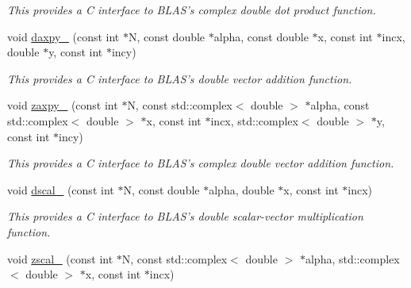 \begin{DoxyCompactItemize}
\begin{DoxyCompactList}\small\item\em This provides a C interface to B\-L\-A\-S's complex double dot product function. \end{DoxyCompactList}\item 
\hypertarget{namespacekeycpp_ae99c5b242a21ba683701ccb6ab6534b1}{void \hyperlink{namespacekeycpp_ae99c5b242a21ba683701ccb6ab6534b1}{daxpy\-\_\-} (const int $\ast$N, const double $\ast$alpha, const double $\ast$x, const int $\ast$incx, double $\ast$y, const int $\ast$incy)}\label{namespacekeycpp_ae99c5b242a21ba683701ccb6ab6534b1}

\begin{DoxyCompactList}\small\item\em This provides a C interface to B\-L\-A\-S's double vector addition function. \end{DoxyCompactList}\item 
\hypertarget{namespacekeycpp_a6460fa334239dde761d8f737b9438fed}{void \hyperlink{namespacekeycpp_a6460fa334239dde761d8f737b9438fed}{zaxpy\-\_\-} (const int $\ast$N, const std\-::complex$<$ double $>$ $\ast$alpha, const std\-::complex$<$ double $>$ $\ast$x, const int $\ast$incx, std\-::complex$<$ double $>$ $\ast$y, const int $\ast$incy)}\label{namespacekeycpp_a6460fa334239dde761d8f737b9438fed}

\begin{DoxyCompactList}\small\item\em This provides a C interface to B\-L\-A\-S's complex double vector addition function. \end{DoxyCompactList}\item 
\hypertarget{namespacekeycpp_a7d249dd978770119c1b91d88009fefbd}{void \hyperlink{namespacekeycpp_a7d249dd978770119c1b91d88009fefbd}{dscal\-\_\-} (const int $\ast$N, const double $\ast$alpha, double $\ast$x, const int $\ast$incx)}\label{namespacekeycpp_a7d249dd978770119c1b91d88009fefbd}

\begin{DoxyCompactList}\small\item\em This provides a C interface to B\-L\-A\-S's double scalar-\/vector multiplication function. \end{DoxyCompactList}\item 
\hypertarget{namespacekeycpp_ad9dd69d0d355e4805a832813199f1dff}{void \hyperlink{namespacekeycpp_ad9dd69d0d355e4805a832813199f1dff}{zscal\-\_\-} (const int $\ast$N, const std\-::complex$<$ double $>$ $\ast$alpha, std\-::complex$<$ double $>$ $\ast$x, const int $\ast$incx)}\label{namespacekeycpp_ad9dd69d0d355e4805a832813199f1dff}


\end{DoxyCompactItemize}
